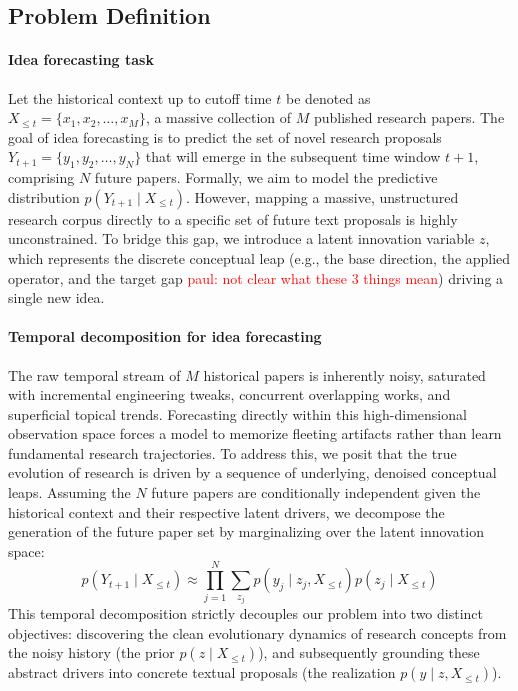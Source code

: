 \documentclass{article} %
\newcommand{\paul}[1]{\textcolor{red}{paul: #1}}
\begin{document}
\subsection{Problem Definition}

\paragraph{Idea forecasting task} Let the historical context up to cutoff time $t$ be denoted as $X_{\le t} = \{x_1, x_2, \dots, x_M\}$, a massive collection of $M$ published research papers. The goal of idea forecasting is to predict the set of novel research proposals $Y_{t+1} = \{y_1, y_2, \dots, y_N\}$ that will emerge in the subsequent time window $t+1$, comprising $N$ future papers. Formally, we aim to model the predictive distribution $p(Y_{t+1} \mid X_{\le t})$. However, mapping a massive, unstructured research corpus directly to a specific set of future text proposals is highly unconstrained. To bridge this gap, we introduce a latent innovation variable $z$, which represents the discrete conceptual leap (e.g., the base direction, the applied operator, and the target gap \paul{not clear what these 3 things mean}) driving a single new idea.

\paragraph{Temporal decomposition for idea forecasting} The raw temporal stream of $M$ historical papers is inherently noisy, saturated with incremental engineering tweaks, concurrent overlapping works, and superficial topical trends. Forecasting directly within this high-dimensional observation space forces a model to memorize fleeting artifacts rather than learn fundamental research trajectories. To address this, we posit that the true evolution of research is driven by a sequence of underlying, denoised conceptual leaps. Assuming the $N$ future papers are conditionally independent given the historical context and their respective latent drivers, we decompose the generation of the future paper set by marginalizing over the latent innovation space:
\begin{equation}
p(Y_{t+1} \mid X_{\le t}) \approx \prod_{j=1}^{N} \sum_{z_j} p(y_j \mid z_j, X_{\le t}) p(z_j \mid X_{\le t})
\end{equation}
This temporal decomposition strictly decouples our problem into two distinct objectives: discovering the clean evolutionary dynamics of research concepts from the noisy history (the prior $p(z \mid X_{\le t})$), and subsequently grounding these abstract drivers into concrete textual proposals (the realization $p(y \mid z, X_{\le t})$).
\end{document}
